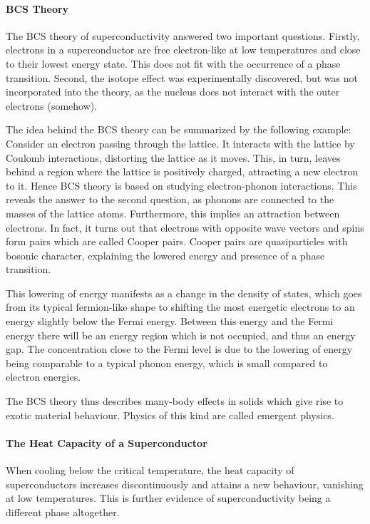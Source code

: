 \paragraph{BCS Theory}
The BCS theory of superconductivity answered two important questions. Firstly, electrons in a superconductor are free electron-like at low temperatures and close to their lowest energy state. This does not fit with the occurrence of a phase transition. Second, the isotope effect was experimentally discovered, but was not incorporated into the theory, as the nucleus does not interact with the outer electrons (somehow).

The idea behind the BCS theory can be summarized by the following example: Consider an electron passing through the lattice. It interacts with the lattice by Coulomb interactions, distorting the lattice as it moves. This, in turn, leaves behind a region where the lattice is positively charged, attracting a new electron to it. Hence BCS theory is based on studying electron-phonon interactions. This reveals the answer to the second question, as phonons are connected to the masses of the lattice atoms. Furthermore, this implies an attraction between electrons. In fact, it turns out that electrons with opposite wave vectors and spins form pairs which are called Cooper pairs. Cooper pairs are quasiparticles with bosonic character, explaining the lowered energy and presence of a phase transition.

This lowering of energy manifests as a change in the density of states, which goes from its typical fermion-like shape to shifting the most energetic electrons to an energy slightly below the Fermi energy. Between this energy and the Fermi energy there will be an energy region which is not occupied, and thus an energy gap. The concentration close to the Fermi level is due to the lowering of energy being comparable to a typical phonon energy, which is small compared to electron energies.

The BCS theory thus describes many-body effects in solids which give rise to exotic material behaviour. Physics of this kind are called emergent physics.

\paragraph{The Heat Capacity of a Superconductor}
When cooling below the critical temperature, the heat capacity of superconductors increases discontinuously and attains a new behaviour, vanishing at low temperatures. This is further evidence of superconductivity being a different phase altogether.

